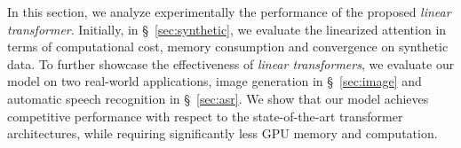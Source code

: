 \begin{algorithm}[h]
    \caption{Linear transformers with causal masking} \label{alg:causal_product}
    \DontPrintSemicolon
    \;
\end{algorithm}

In this section, we analyze experimentally the performance of the proposed
\emph{linear transformer}. Initially, in \S~\ref{sec:synthetic}, we evaluate the linearized attention in terms of computational cost, memory consumption and convergence on synthetic data. To further showcase the effectiveness of
\emph{linear transformers}, we evaluate our model on two real-world applications, image generation in \S~\ref{sec:image} and automatic speech recognition in
\S~\ref{sec:asr}. We show that our model achieves competitive performance with respect to the state-of-the-art transformer architectures, while requiring significantly less GPU memory and computation.

